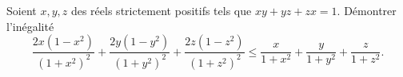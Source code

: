 Soient $x, y, z$ des réels strictement positifs tels que $xy + yz + zx = 1$. Démontrer l'inégalité
\[ \frac{2x(1 - x^2)}{(1 + x^2)^2} + \frac{2y(1 - y^2)}{(1 + y^2)^2} + \frac{2z(1 - z^2)}{(1 + z^2)^2} \leq \frac{x}{1 + x^2} + \frac{y}{1 + y^2} + \frac{z}{1 + z^2}. \]
